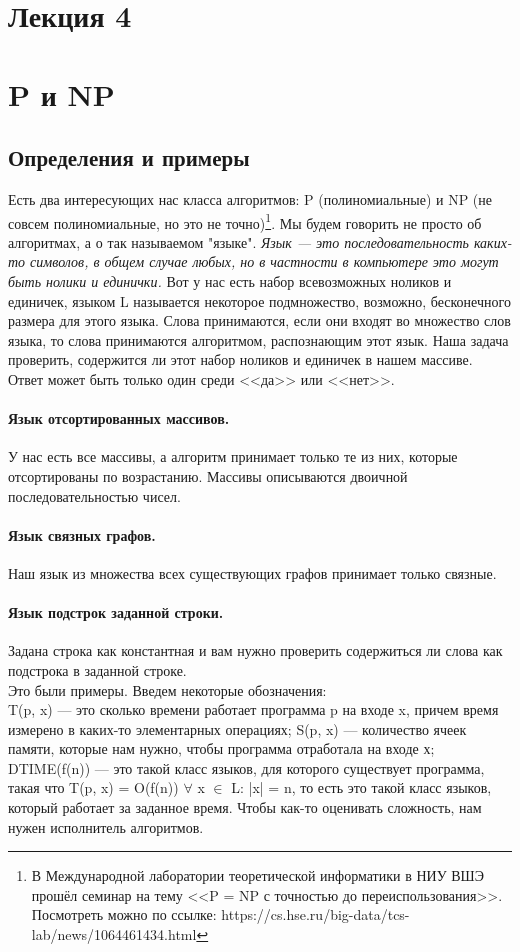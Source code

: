 \documentclass[12pt]{article}
\begin{document}
\newpage
\section*{Лекция 4}
\section*{P и NP}

\subsection*{Определения и примеры}
Есть два интересующих нас класса алгоритмов: P (полиномиальные) и NP (не совсем полиномиальные, но это не точно)\footnote{В Международной лаборатории теоретической информатики в НИУ ВШЭ прошёл семинар на тему <<P = NP с точностью до переиспользования>>. Посмотреть можно по ссылке: https://cs.hse.ru/big-data/tcs-lab/news/1064461434.html}. Мы будем говорить не просто об алгоритмах, а о так называемом "языке". \textit{Язык --- это последовательность каких-то символов, в общем случае любых, но в частности в компьютере это могут быть нолики и единички.} Вот у нас есть набор всевозможных ноликов и единичек, языком L называется некоторое подмножество, возможно, бесконечного размера для этого языка. Слова принимаются, если они входят во множество слов языка, то слова принимаются алгоритмом, распознающим этот язык. Наша задача проверить, содержится ли этот набор ноликов и единичек в нашем массиве. Ответ может быть только один среди <<да>> или <<нет>>.

\paragraph{Язык отсортированных массивов.} У нас есть все массивы, а алгоритм принимает только те из них, которые отсортированы по возрастанию. Массивы описываются двоичной последовательностью чисел.
\paragraph{Язык связных графов.} Наш язык из множества всех существующих графов принимает только связные.
\paragraph{Язык подстрок заданной строки.} Задана строка как константная и вам нужно проверить содержиться ли слова как подстрока в заданной строке.
\\
Это были примеры. Введем некоторые обозначения:\\
T(p, x) --- это сколько времени работает программа p на входе x, причем время измерено в каких-то элементарных операциях; S(p, x) --- количество ячеек памяти, которые нам нужно, чтобы программа отработала на входе х; DTIME(f(n)) --- это такой класс языков, для которого существует программа, такая что T(p, x) = O(f(n)) $\forall$ x $\in$ L: |x| = n, то есть это такой класс языков, который работает за заданное время.
Чтобы как-то оценивать сложность, нам нужен исполнитель алгоритмов.
\end{document}
